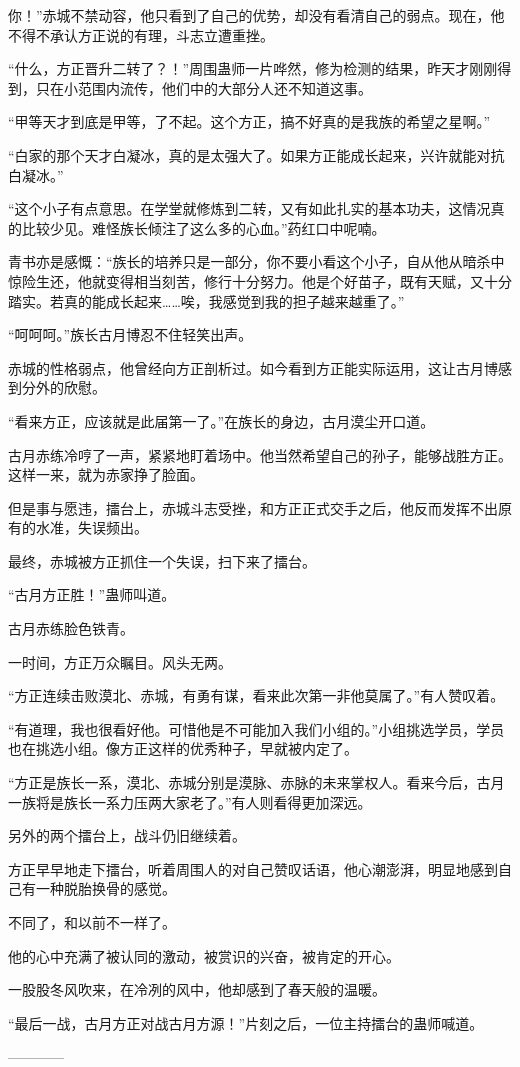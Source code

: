 \begin{this_body}
你！”赤城不禁动容，他只看到了自己的优势，却没有看清自己的弱点。现在，他不得不承认方正说的有理，斗志立遭重挫。

“什么，方正晋升二转了？！”周围蛊师一片哗然，修为检测的结果，昨天才刚刚得到，只在小范围内流传，他们中的大部分人还不知道这事。

“甲等天才到底是甲等，了不起。这个方正，搞不好真的是我族的希望之星啊。”

“白家的那个天才白凝冰，真的是太强大了。如果方正能成长起来，兴许就能对抗白凝冰。”

“这个小子有点意思。在学堂就修炼到二转，又有如此扎实的基本功夫，这情况真的比较少见。难怪族长倾注了这么多的心血。”药红口中呢喃。

青书亦是感慨：“族长的培养只是一部分，你不要小看这个小子，自从他从暗杀中惊险生还，他就变得相当刻苦，修行十分努力。他是个好苗子，既有天赋，又十分踏实。若真的能成长起来……唉，我感觉到我的担子越来越重了。”

“呵呵呵。”族长古月博忍不住轻笑出声。

赤城的性格弱点，他曾经向方正剖析过。如今看到方正能实际运用，这让古月博感到分外的欣慰。

“看来方正，应该就是此届第一了。”在族长的身边，古月漠尘开口道。

古月赤练冷哼了一声，紧紧地盯着场中。他当然希望自己的孙子，能够战胜方正。这样一来，就为赤家挣了脸面。

但是事与愿违，擂台上，赤城斗志受挫，和方正正式交手之后，他反而发挥不出原有的水准，失误频出。

最终，赤城被方正抓住一个失误，扫下来了擂台。

“古月方正胜！”蛊师叫道。

古月赤练脸色铁青。

一时间，方正万众瞩目。风头无两。

“方正连续击败漠北、赤城，有勇有谋，看来此次第一非他莫属了。”有人赞叹着。

“有道理，我也很看好他。可惜他是不可能加入我们小组的。”小组挑选学员，学员也在挑选小组。像方正这样的优秀种子，早就被内定了。

“方正是族长一系，漠北、赤城分别是漠脉、赤脉的未来掌权人。看来今后，古月一族将是族长一系力压两大家老了。”有人则看得更加深远。

另外的两个擂台上，战斗仍旧继续着。

方正早早地走下擂台，听着周围人的对自己赞叹话语，他心潮澎湃，明显地感到自己有一种脱胎换骨的感觉。

不同了，和以前不一样了。

他的心中充满了被认同的激动，被赏识的兴奋，被肯定的开心。

一股股冬风吹来，在冷冽的风中，他却感到了春天般的温暖。

“最后一战，古月方正对战古月方源！”片刻之后，一位主持擂台的蛊师喊道。

------------

\end{this_body}

